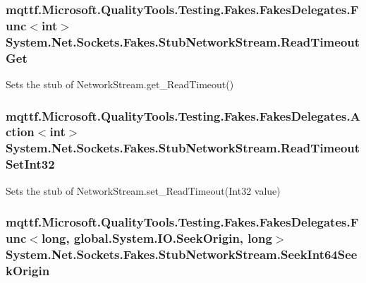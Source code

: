 \hypertarget{class_system_1_1_net_1_1_sockets_1_1_fakes_1_1_stub_network_stream_a966c95224f949ae725c06c1ab9b22e27}{
\subsubsection[{Read\-Timeout\-Get}]{\setlength{\rightskip}{0pt plus 5cm}mqttf.\-Microsoft.\-Quality\-Tools.\-Testing.\-Fakes.\-Fakes\-Delegates.\-Func$<$int$>$ System.\-Net.\-Sockets.\-Fakes.\-Stub\-Network\-Stream.\-Read\-Timeout\-Get}}\label{class_system_1_1_net_1_1_sockets_1_1_fakes_1_1_stub_network_stream_a966c95224f949ae725c06c1ab9b22e27}


Sets the stub of Network\-Stream.\-get\-\_\-\-Read\-Timeout()

\hypertarget{class_system_1_1_net_1_1_sockets_1_1_fakes_1_1_stub_network_stream_a63f017787e6f9a71bafe280da66b8d5d}{
\subsubsection[{Read\-Timeout\-Set\-Int32}]{\setlength{\rightskip}{0pt plus 5cm}mqttf.\-Microsoft.\-Quality\-Tools.\-Testing.\-Fakes.\-Fakes\-Delegates.\-Action$<$int$>$ System.\-Net.\-Sockets.\-Fakes.\-Stub\-Network\-Stream.\-Read\-Timeout\-Set\-Int32}}\label{class_system_1_1_net_1_1_sockets_1_1_fakes_1_1_stub_network_stream_a63f017787e6f9a71bafe280da66b8d5d}


Sets the stub of Network\-Stream.\-set\-\_\-\-Read\-Timeout(\-Int32 value)

\hypertarget{class_system_1_1_net_1_1_sockets_1_1_fakes_1_1_stub_network_stream_a1fc40cdea2f4c6693f5b1c9d5ee17038}{
\subsubsection[{Seek\-Int64\-Seek\-Origin}]{\setlength{\rightskip}{0pt plus 5cm}mqttf.\-Microsoft.\-Quality\-Tools.\-Testing.\-Fakes.\-Fakes\-Delegates.\-Func$<$long, global.\-System.\-I\-O.\-Seek\-Origin, long$>$ System.\-Net.\-Sockets.\-Fakes.\-Stub\-Network\-Stream.\-Seek\-Int64\-Seek\-Origin}}\label{class_system_1_1_net_1_1_sockets_1_1_fakes_1_1_stub_network_stream_a1fc40cdea2f4c6693f5b1c9d5ee17038}


